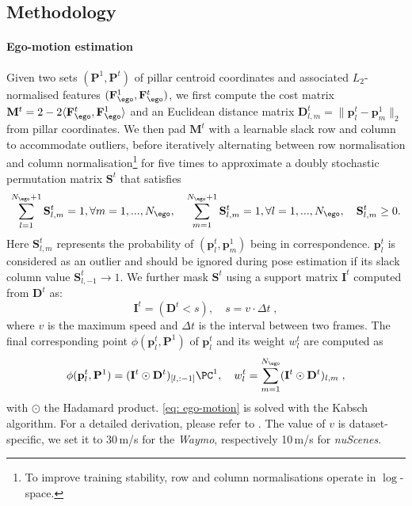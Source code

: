 \subsection{Methodology}
\label{sec:supp_eccv_method}
\paragraph{Ego-motion estimation}
Given two sets $(\mathbf{P}^1,\mathbf{P}^t)$ of pillar centroid coordinates and associated $L_2$-normalised features $(\mathbf{F}^1_{\ego}, \mathbf{F}^t_{\ego})$, we first compute the cost matrix $\mathbf{M}^t = 2 - 2\langle \mathbf{F}^t_{\ego}, {\mathbf{F}^1_{\ego}}\rangle$ and an Euclidean distance matrix $\mathbf{D}^t_{l,m} = \|\mathbf{p}^t_l - \mathbf{p}^1_m\|_2$ from pillar coordinates. We then pad $\mathbf{M}^t$ with a learnable slack row and column to accommodate outliers, before iteratively alternating between row normalisation and column normalisation\footnote{To improve training stability, row and column normalisations operate in $\log$-space.} for five times to approximate a doubly stochastic permutation matrix $\mathbf{S}^t$ that satisfies
\begin{equation}
    \sum_{l=1}^{N_\ego+1} \mathbf{S}^t_{l, m} =1, \forall m=1, ..., N_\ego,  \quad \sum_{m=1}^{N_\ego+1} \mathbf{S}^t_{l, m} =1, \forall l=1, ..., N_\ego, \quad \mathbf{S}^t_{l,m} \geq 0. 
\end{equation}
Here $\mathbf{S}^t_{l,m}$ represents the probability of $(\mathbf{p}_l^t, \mathbf{p}_m^1)$ being in correspondence. $\mathbf{p}_l^t$ is considered as an outlier and should be ignored during pose estimation if its slack column value $\mathbf{S}^t_{l,-1} \rightarrow 1$.
We further mask $\mathbf{S}^t$ using a support matrix $\mathbf{I}^t$ computed from $\mathbf{D}^t$ as:
\begin{equation}
    \mathbf{I}^t = \left(\mathbf{D}^t < s\right), \quad s = v \cdot \Delta t\;,
\end{equation}
where $v$ is the maximum speed and $\Delta t$ is the interval between two frames. The final corresponding point $\phi(\mathbf{p}_l^t, \mathbf{P}^1)$ of $\mathbf{p}_l^t$ and its weight $w_l^t$ are computed as
\begin{equation}
    \phi(\mathbf{p}_l^t, \mathbf{P}^1) = (\mathbf{I}^t \odot \mathbf{D}^t)_{[l, :-1]} \PC^1, \quad w_l^t = \sum_{m=1}^{N_\ego} (\mathbf{I}^t \odot \mathbf{D}^t)_{l, m}\;,
\end{equation}
with $\odot$ the Hadamard product. \cref{eq: ego-motion} is solved with the Kabsch algorithm. For a detailed derivation, please refer to \cite{gojcic2021weakly}. The value of $v$ is dataset-specific, we set it to 30$\,$m/s for the \emph{Waymo}, respectively 10$\,$m/s for \emph{nuScenes}.

